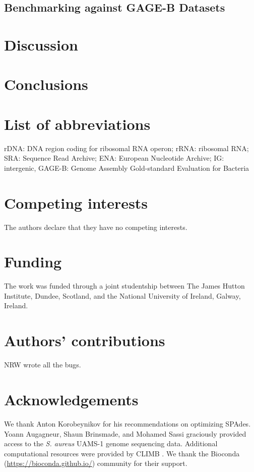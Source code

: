 \documentclass[10pt]{article}
\begin{document}
\begin{linenumbers}


\subsection*{Benchmarking against GAGE-B Datasets}




\section*{Discussion}


\section*{Conclusions}


\end{linenumbers}
\baselineskip13pt

\section*{List of abbreviations}
rDNA: DNA region coding for ribosomal RNA operon; rRNA: ribosomal RNA; SRA: Sequence Read Archive; ENA: European Nucleotide Archive; IG: intergenic, GAGE-B: Genome Assembly Gold-standard Evaluation for Bacteria


\section*{Competing interests}
The authors declare that they have no competing interests.

\section*{Funding}
The work was funded through a joint studentship between The James Hutton Institute, Dundee, Scotland, and the National University of Ireland, Galway, Ireland.

\section*{Authors' contributions}
NRW wrote all the bugs.

\section*{Acknowledgements}
We thank Anton Korobeynikov for his recommendations on optimizing SPAdes. Yoann Augagneur, Shaun Brinsmade, and Mohamed Sassi graciously provided access to the \textit{S. aureus} UAMS-1 genome sequencing data.  Additional computational resources were provided by CLIMB \cite{Connor2016}. We thank the Bioconda (\url{https://bioconda.github.io/}) community for their support.
\end{document}
